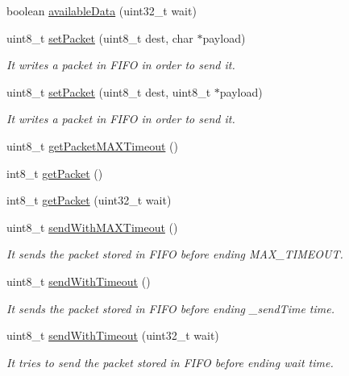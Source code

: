 \begin{DoxyCompactItemize}
boolean \hyperlink{class_wasp_s_x1272_aabf4255a8e88a94a5a3380744a880a13}{available\+Data} (uint32\+\_\+t wait)
\item 
uint8\+\_\+t \hyperlink{class_wasp_s_x1272_a2edc7d42bf60617e412f162d3f8c38d8}{set\+Packet} (uint8\+\_\+t dest, char $\ast$payload)
\begin{DoxyCompactList}\small\item\em It writes a packet in F\+I\+FO in order to send it. \end{DoxyCompactList}\item 
uint8\+\_\+t \hyperlink{class_wasp_s_x1272_a409523a65d537469885820fa19287e29}{set\+Packet} (uint8\+\_\+t dest, uint8\+\_\+t $\ast$payload)
\begin{DoxyCompactList}\small\item\em It writes a packet in F\+I\+FO in order to send it. \end{DoxyCompactList}\item 
uint8\+\_\+t \hyperlink{class_wasp_s_x1272_a40866e414879532539620dc1120ffc8f}{get\+Packet\+M\+A\+X\+Timeout} ()
\item 
int8\+\_\+t \hyperlink{class_wasp_s_x1272_ab49d2bfcf3588738ddc067aa0e7b2256}{get\+Packet} ()
\item 
int8\+\_\+t \hyperlink{class_wasp_s_x1272_a20a7df488b2d492df0beea9960020361}{get\+Packet} (uint32\+\_\+t wait)
\item 
uint8\+\_\+t \hyperlink{class_wasp_s_x1272_ad6fb27179a1f937346ca666c219fc293}{send\+With\+M\+A\+X\+Timeout} ()
\begin{DoxyCompactList}\small\item\em It sends the packet stored in F\+I\+FO before ending M\+A\+X\+\_\+\+T\+I\+M\+E\+O\+UT. \end{DoxyCompactList}\item 
uint8\+\_\+t \hyperlink{class_wasp_s_x1272_a03f4f66d0e107c9129d9662e64e40d19}{send\+With\+Timeout} ()
\begin{DoxyCompactList}\small\item\em It sends the packet stored in F\+I\+FO before ending \+\_\+send\+Time time. \end{DoxyCompactList}\item 
uint8\+\_\+t \hyperlink{class_wasp_s_x1272_ac3371b85caddc32797a02f0344e8742c}{send\+With\+Timeout} (uint32\+\_\+t wait)
\begin{DoxyCompactList}\small\item\em It tries to send the packet stored in F\+I\+FO before ending \textquotesingle{}wait\textquotesingle{} time. \end{DoxyCompactList}\item 

\end{DoxyCompactItemize}
